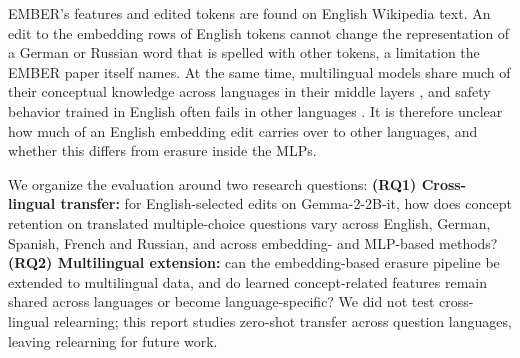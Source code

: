 \documentclass[11pt]{article}
\begin{document}
EMBER's features and edited tokens are found on English Wikipedia text.
An edit to the embedding rows of English tokens cannot change the representation of a German or Russian word that is spelled with other tokens, a limitation the EMBER paper itself names.
At the same time, multilingual models share much of their conceptual knowledge across languages in their middle layers \citep{wendler2024llamas,qi2023crosslingual}, and safety behavior trained in English often fails in other languages \citep{deng2024multilingual,yong2023lowresource}.
It is therefore unclear how much of an English embedding edit carries over to other languages, and whether this differs from erasure inside the MLPs.

We organize the evaluation around two research questions:
\textbf{(RQ1) Cross-lingual transfer:} for English-selected edits on Gemma-2-2B-it, how does concept retention on translated multiple-choice questions vary across English, German, Spanish, French and Russian, and across embedding- and MLP-based methods?
\textbf{(RQ2) Multilingual extension:} can the embedding-based erasure pipeline be extended to multilingual data, and do learned concept-related features remain shared across languages or become language-specific?
We did not test cross-lingual relearning; this report studies zero-shot transfer across question languages, leaving relearning for future work.
\end{document}
